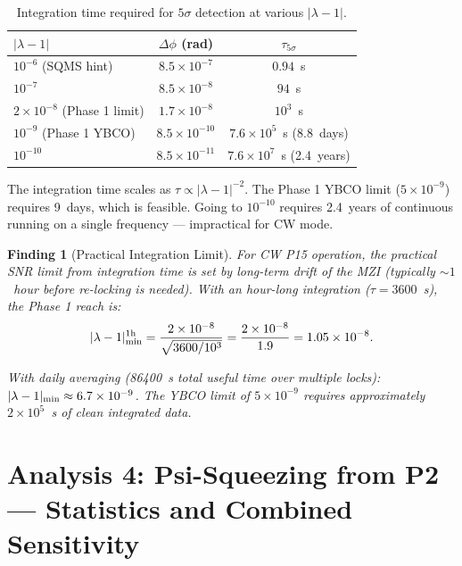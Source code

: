 \documentclass[11pt]{article}
\newtheorem{finding}{Finding}
\newcommand{\ee}[1]{\times 10^{#1}}
\newcommand{\lam}{\lambda}
\begin{document}
\begin{table}[H]
\centering
\caption{Integration time required for $5\sigma$ detection at various $|\lam-1|$.}
\begin{tabular}{lcc}
\toprule
$|\lam-1|$ & $\Delta\phi$ (rad) & $\tau_{5\sigma}$ \\
\midrule
$10^{-6}$ (SQMS hint) & $8.5\ee{-7}$ & $0.94$~s \\
$10^{-7}$ & $8.5\ee{-8}$ & $94$~s \\
$2\ee{-8}$ (Phase 1 limit) & $1.7\ee{-8}$ & $10^3$~s \\
$10^{-9}$ (Phase 1 YBCO) & $8.5\ee{-10}$ & $7.6\ee{5}$~s ($8.8$~days) \\
$10^{-10}$ & $8.5\ee{-11}$ & $7.6\ee{7}$~s (2.4~years) \\
\bottomrule
\end{tabular}
\end{table}

The integration time scales as $\tau \propto |\lam-1|^{-2}$. The Phase 1 YBCO
limit ($5\ee{-9}$) requires 9~days, which is feasible. Going to $10^{-10}$
requires 2.4~years of continuous running on a single frequency --- impractical
for CW mode.

\begin{finding}[Practical Integration Limit]
\label{find:inttime}
For CW P15 operation, the practical SNR limit from integration time is set by
long-term drift of the MZI (typically $\sim 1$~hour before re-locking is needed).
With an hour-long integration ($\tau = 3600$~s), the Phase 1 reach is:
\begin{equation}
|\lam-1|_{\rm min}^{\rm 1h} = \frac{2\ee{-8}}{\sqrt{3600/10^3}} = \frac{2\ee{-8}}{1.9}
= 1.05\ee{-8}.
\end{equation}

With daily averaging (86400~s total useful time over multiple locks):
$|\lam-1|_{\rm min} \approx 6.7\ee{-9}$. The YBCO limit of $5\ee{-9}$ requires
approximately $2 \times 10^5$~s of clean integrated data.
\end{finding}

\section{Analysis 4: Psi-Squeezing from P2 --- Statistics and Combined Sensitivity}
\label{sec:psi-squeezing}
\end{document}
